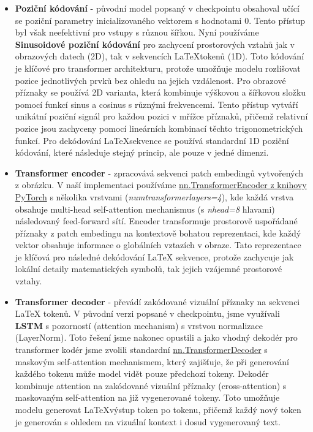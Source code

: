 \begin{itemize}
    \item \textbf{Poziční kódování} - původní model popsaný v checkpointu obsahoval učící se poziční parametry inicializovaného vektorem s hodnotami 0. Tento přístup byl však neefektivní pro vstupy s různou šířkou. Nyní používáme \textbf{Sinusoidové poziční kódování} \cite{sinusoidal-encoding} pro zachycení prostorových vztahů jak v obrazových datech (2D), tak v sekvencích \LaTeX tokenů (1D). Toto kódování je klíčové pro transformer architekturu, protože umožňuje modelu rozlišovat pozice jednotlivých prvků bez ohledu na jejich vzdálenost. Pro obrazové příznaky se používá 2D varianta, která kombinuje výškovou a šířkovou složku pomocí funkcí sinus a cosinus s různými frekvencemi. Tento přístup vytváří unikátní poziční signál pro každou pozici v mřížce příznaků, přičemž relativní pozice jsou zachyceny pomocí lineárních kombinací těchto trigonometrických funkcí. Pro dekódování \LaTeX sekvence se používá standardní 1D poziční kódování, které následuje stejný princip, ale pouze v jedné dimenzi.
    \item \textbf{Transformer encoder} - zpracovává sekvenci patch embedingů vytvořených z obrázku. V naší implementaci používáme \href{https://docs.pytorch.org/docs/stable/generated/torch.nn.TransformerEncoderLayer.html}{nn.TransformerEncoder z knihovy PyTorch} s několika vrstvami (\textit{num\textunderscore transformer\textunderscore layers=4}), kde každá vrstva obsahuje multi-head self-attention mechanismus (s \textit{nhead=8} hlavami) následovaný feed-forward sítí. Encoder transformuje prostorově uspořádané příznaky z patch embedingu na kontextově bohatou reprezentaci, kde každý vektor obsahuje informace o globálních vztazích v obraze. Tato reprezentace je klíčová pro následné dekódování LaTeX sekvence, protože zachycuje jak lokální detaily matematických symbolů, tak jejich vzájemné prostorové vztahy.
    \item \textbf{Transformer decoder} - převádí zakódované vizuální příznaky na sekvenci LaTeX tokenů. V původní verzi popsané v checkpointu, jsme využívali \textbf{LSTM} s pozorností (attention mechanism) s vrstvou normalizace (LayerNorm). Toto řešení jsme nakonec opustili a jako vhodný dekodér pro transformer kodér jsme zvolili standardní \href{https://docs.pytorch.org/docs/stable/generated/torch.nn.TransformerDecoderLayer.html}{nn.TransformerDecoder} s maskovým self-attention mechanismem, který zajišťuje, že při generování každého tokenu může model vidět pouze předchozí tokeny. Dekodér kombinuje attention na zakódované vizuální příznaky (cross-attention) s maskovaným self-attention na již vygenerované tokeny. Toto umožňuje modelu generovat \LaTeX výstup token po tokenu, přičemž každý nový token je generován s ohledem na vizuální kontext i dosud vygenerovaný text.
\end{itemize}

